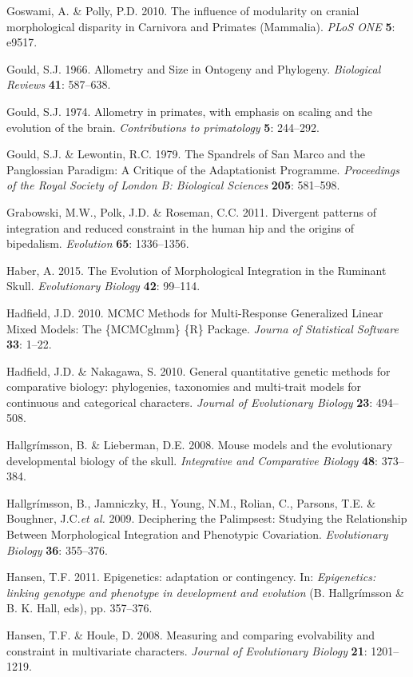 \documentclass[12pt,twoside]{report}
\begin{document}
Goswami, A. \& Polly, P.D. 2010. The influence of modularity on cranial
morphological disparity in Carnivora and Primates (Mammalia). \emph{PLoS
ONE} \textbf{5}: e9517.

Gould, S.J. 1966. Allometry and Size in Ontogeny and Phylogeny.
\emph{Biological Reviews} \textbf{41}: 587--638.

Gould, S.J. 1974. Allometry in primates, with emphasis on scaling and
the evolution of the brain. \emph{Contributions to primatology}
\textbf{5}: 244--292.

Gould, S.J. \& Lewontin, R.C. 1979. The Spandrels of San Marco and the
Panglossian Paradigm: A Critique of the Adaptationist Programme.
\emph{Proceedings of the Royal Society of London B: Biological Sciences}
\textbf{205}: 581--598.

Grabowski, M.W., Polk, J.D. \& Roseman, C.C. 2011. Divergent patterns of
integration and reduced constraint in the human hip and the origins of
bipedalism. \emph{Evolution} \textbf{65}: 1336--1356.

Haber, A. 2015. The Evolution of Morphological Integration in the
Ruminant Skull. \emph{Evolutionary Biology} \textbf{42}: 99--114.

Hadfield, J.D. 2010. MCMC Methods for Multi-Response Generalized Linear
Mixed Models: The \{MCMCglmm\} \{R\} Package. \emph{Journa of
Statistical Software} \textbf{33}: 1--22.

Hadfield, J.D. \& Nakagawa, S. 2010. General quantitative genetic
methods for comparative biology: phylogenies, taxonomies and multi-trait
models for continuous and categorical characters. \emph{Journal of
Evolutionary Biology} \textbf{23}: 494--508.

Hallgrímsson, B. \& Lieberman, D.E. 2008. Mouse models and the
evolutionary developmental biology of the skull. \emph{Integrative and
Comparative Biology} \textbf{48}: 373--384.

Hallgrímsson, B., Jamniczky, H., Young, N.M., Rolian, C., Parsons, T.E.
\& Boughner, J.C.\emph{et al.} 2009. Deciphering the Palimpsest:
Studying the Relationship Between Morphological Integration and
Phenotypic Covariation. \emph{Evolutionary Biology} \textbf{36}:
355--376.

Hansen, T.F. 2011. Epigenetics: adaptation or contingency. In:
\emph{Epigenetics: linking genotype and phenotype in development and
evolution} (B. Hallgrímsson \& B. K. Hall, eds), pp. 357--376.

Hansen, T.F. \& Houle, D. 2008. Measuring and comparing evolvability and
constraint in multivariate characters. \emph{Journal of Evolutionary
Biology} \textbf{21}: 1201--1219.
\end{document}
